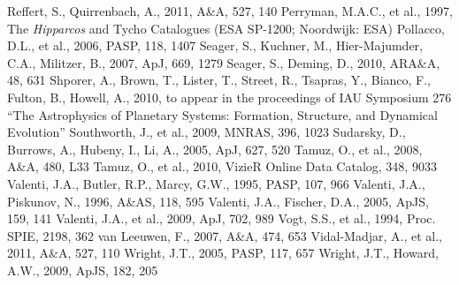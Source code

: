 \documentclass[12pt,preprint]{emulateapj}
\begin{document}
\begin{thebibliography}{}
  Reffert, S., Quirrenbach, A., 2011, A\&A, 527, 140
  Perryman, M.A.C., et al., 1997, The {\it Hipparcos} and Tycho
  Catalogues (ESA SP-1200; Noordwijk: ESA)
  Pollacco, D.L., et al., 2006, PASP, 118, 1407
 Seager,
  S., Kuchner, M., Hier-Majumder, C.A., Militzer, B., 2007, ApJ, 669,
  1279
  Seager, S., Deming, D., 2010, ARA\&A, 48, 631
  Shporer, A., Brown, T., Lister, T., Street, R., Tsapras, Y., Bianco,
  F., Fulton, B., Howell, A., 2010, to appear in the proceedings of
  IAU Symposium 276 ``The Astrophysics of Planetary Systems:
  Formation, Structure, and Dynamical Evolution''
  Southworth, J., et al., 2009, MNRAS, 396, 1023
  Sudarsky, D., Burrows, A., Hubeny, I., Li, A., 2005, ApJ, 627, 520
 Tamuz,
  O., et al., 2008, A\&A, 480, L33
 Tamuz,
  O., et al., 2010, VizieR Online Data Catalog, 348, 9033
  Valenti, J.A., Butler, R.P., Marcy, G.W., 1995, PASP, 107, 966
  Valenti, J.A., Piskunov, N., 1996, A\&AS, 118, 595
  Valenti, J.A., Fischer, D.A., 2005, ApJS, 159, 141
  Valenti, J.A., et al., 2009, ApJ, 702, 989
 Vogt,
  S.S., et al., 1994, Proc. SPIE, 2198, 362
  van Leeuwen, F., 2007, A\&A, 474, 653
  Vidal-Madjar, A., et al., 2011, A\&A, 527, 110
 Wright, J.T.,
  2005, PASP, 117, 657
  Wright, J.T., Howard, A.W., 2009, ApJS, 182, 205

\end{thebibliography}
\end{document}

